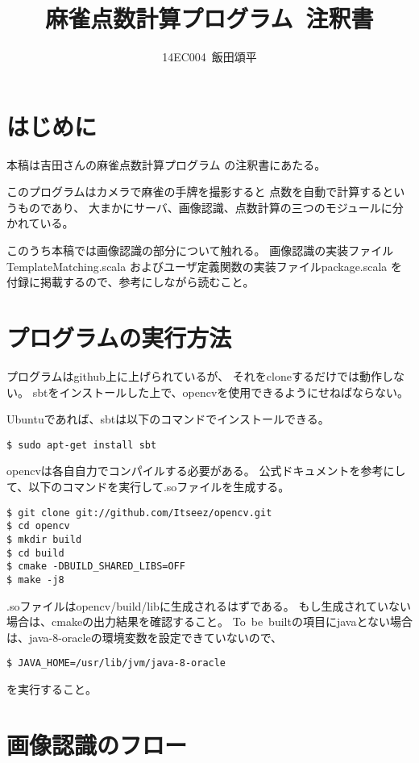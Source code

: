 \documentclass{jsarticle}
\title{麻雀点数計算プログラム\ 注釈書}
\author{14EC004\ 飯田頌平}
\begin{document}
\maketitle

\begin{multicols}{2}

\section{はじめに}
本稿は吉田さんの麻雀点数計算プログラム\cite{yoshida}
の注釈書にあたる。

このプログラムはカメラで麻雀の手牌を撮影すると
点数を自動で計算するというものであり、
大まかにサーバ、画像認識、点数計算の三つのモジュールに分かれている。

このうち本稿では画像認識の部分について触れる。
画像認識の実装ファイルTemplateMatching.scala
およびユーザ定義関数の実装ファイルpackage.scala
を付録に掲載するので、参考にしながら読むこと。

\section{プログラムの実行方法}

プログラムはgithub上に上げられているが、
それをcloneするだけでは動作しない。
sbtをインストールした上で、opencvを使用できるようにせねばならない。

Ubuntuであれば、sbtは以下のコマンドでインストールできる。
\begin{lstlisting}[caption=sbt,label=sbt]
$ sudo apt-get install sbt
\end{lstlisting}

opencvは各自自力でコンパイルする必要がある。
公式ドキュメントを参考にして、以下のコマンドを実行して.soファイルを生成する。
\begin{lstlisting}[caption=opencv,label=opencv]
$ git clone git://github.com/Itseez/opencv.git
$ cd opencv
$ mkdir build
$ cd build
$ cmake -DBUILD_SHARED_LIBS=OFF
$ make -j8
\end{lstlisting}

.soファイルはopencv/build/libに生成されるはずである。
もし生成されていない場合は、cmakeの出力結果を確認すること。
To\ be\ builtの項目にjavaとない場合は、java-8-oracleの環境変数を設定できていないので、
\begin{lstlisting}[caption=JAVAHOME,label=j]
$ JAVA_HOME=/usr/lib/jvm/java-8-oracle
\end{lstlisting}
を実行すること。

\section{画像認識のフロー}


\end{multicols}
\end{document}
